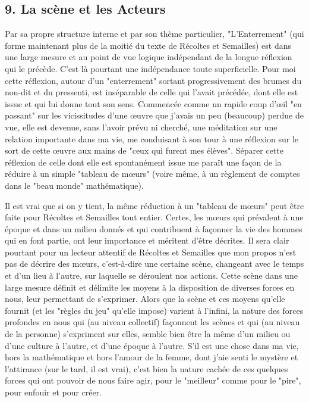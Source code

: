 \subsection{9. La scène et les Acteurs}

Par sa propre structure interne et par son thème particulier, "L'Enterrement" (qui forme maintenant plus de la moitié du texte de Récoltes et Semailles) est dans une large mesure et au point de vue logique indépendant de la longue réflexion qui le précède. C'est là pourtant une indépendance toute superficielle. Pour moi cette réflexion, autour d'un "enterrement" sortant progressivement des brumes du non-dit et du pressenti, est inséparable de celle qui l'avait précédée, dont elle est issue et qui lui donne tout son sens. Commencée comme un rapide coup d'œil "en passant" sur les vicissitudes d'une œuvre que j'avais un peu (beaucoup) perdue de vue, elle est devenue, sans l'avoir prévu ni cherché, une méditation sur une relation importante dans ma vie, me conduisant à son tour à une réflexion sur le sort de cette œuvre aux mains de "ceux qui furent mes élèves". Séparer cette réflexion de celle dont elle est spontanément issue me paraît une façon de la réduire à un simple "tableau de mœurs" (voire même, à un règlement de comptes dans le "beau monde" mathématique).

Il est vrai que si on y tient, la même réduction à un "tableau de mœurs" peut être faite pour Récoltes et Semailles tout entier. Certes, les mœurs qui prévalent à une époque et dans un milieu donnés et qui contribuent à façonner la vie des hommes qui en font partie, ont leur importance et méritent d'être décrites. Il sera clair pourtant pour un lecteur attentif de Récoltes et Semailles que mon propos n'est pas de décrire des mœurs, c'est-à-dire une certaine scène, changeant avec le temps et d'un lieu à l'autre, sur laquelle se déroulent nos actions. Cette scène dans une large mesure définit et délimite les moyens à la disposition de diverses forces en nous, leur permettant de s'exprimer. Alors que la scène et ces moyens qu'elle fournit (et les "règles du jeu" qu'elle impose) varient à l'infini, la nature des forces profondes en nous qui (au niveau collectif) façonnent les scènes et qui (au niveau de la personne) s'expriment sur elles, semble bien être la même d'un milieu ou d'une culture à l'autre, et d'une époque à l'autre. S'il est une chose dans ma vie, hors la mathématique et hors l'amour de la femme, dont j'aie senti le mystère et l'attirance (sur le tard, il est vrai), c'est bien la nature cachée de ces quelques forces qui ont pouvoir de nous faire agir, pour le "meilleur" comme pour le "pire", pour enfouir et pour créer.

